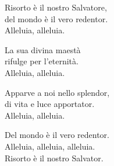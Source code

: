 
\strofa Risorto è il nostro Salvatore,\\
del mondo è il vero redentor.\\
Alleluia, alleluia.

\spazio

\strofa La sua divina maestà\\
rifulge per l'eternità.\\
Alleluia, alleluia.

\spazio

\strofa Apparve a noi nello splendor,\\
di vita e luce apportator.\\
Alleluia, alleluia.

\spazio

\strofa Del mondo è il vero redentor.\\
Alleluia, alleluia, alleluia.\\
Risorto è il nostro Salvator.